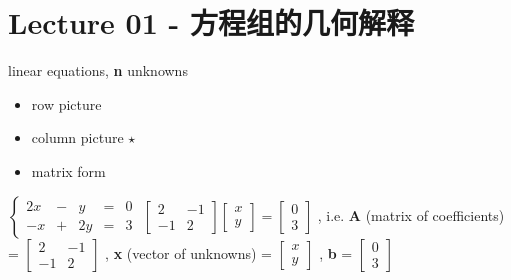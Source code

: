 \documentclass[12pt, a4paper]{article}
\begin{document}
	
{\tableofcontents}
\newpage


\section{Lecture 01 - 方程组的几何解释}
\pagestyle{fancy}
\lhead{}
\rhead{}

 linear equations, {\bf{n}} unknowns
\begin{itemize}
	\item row picture
	\item column picture {\textcolor{anhao-scarlet}{\bf{$\star$}}}
	\item matrix form
\end{itemize}
\vspace{14pt}
\begin{math}
\left\{  
\begin{array}{rclrcl}
	2x & - & y  & = & 0 \\
	-x & + & 2y & = & 3
\end{array}  
\right.
\end{math}
\newline
\begin{math}
\begin{bmatrix}
	2  & -1 \\
	-1 & 2
\end{bmatrix}
\begin{bmatrix}
	x \\
	y
\end{bmatrix}
=
\begin{bmatrix}
	0 \\
	3
\end{bmatrix}
\end{math}
, i.e.
\newline
{\bf{A}} (matrix of coefficients) = 
\begin{math}
\begin{bmatrix}
	2  & -1 \\
	-1 & 2
\end{bmatrix}
\end{math}
, {\bf{x}} (vector of unknowns) = 
\begin{math}
\begin{bmatrix}
	x \\
	y
\end{bmatrix}
\end{math}
, {\bf{b}} = 
\begin{math}
\begin{bmatrix}
	0 \\
	3
\end{bmatrix}
\end{math}
\end{document}

